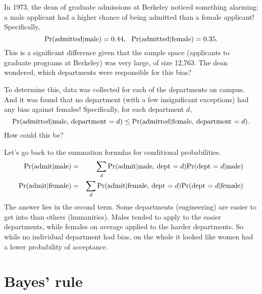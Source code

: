 In 1973, the dean of graduate admissions at Berkeley noticed something alarming: a male applicant had a higher chance of being admitted than a female applicant! Specifically, 
$$ \mbox{\rm Pr}(\mbox{admitted} | \mbox{male}) = 0.44, 
\ \  \mbox{\rm Pr}(\mbox{admitted} | \mbox{female}) = 0.35.$$
This is a significant difference given that the sample space (applicants to graduate programs at Berkeley) was very large, of size 12{,}763. The dean wondered, which departments were responsible for this bias?

To determine this, data was collected for each of the departments on campus. And it was found that no department (with a few insignificant exceptions) had any bias against females! Specifically, for each department $d$,
$$ \mbox{\rm Pr}(\mbox{admitted} | \mbox{male, department $=d$}) 
\leq \mbox{\rm Pr}(\mbox{admitted} | \mbox{female, department $=d$}).$$
How could this be?

Let's go back to the summation formulas for conditional probabilities.
\begin{eqnarray*}
\mbox{\rm Pr}(\mbox{admit} | \mbox{male}) 
& = & 
\sum_d \mbox{\rm Pr}(\mbox{admit} | \mbox{male, dept $= d$}) \mbox{\rm Pr}(\mbox{dept $=d$} | \mbox{male}) \\
\mbox{\rm Pr}(\mbox{admit} | \mbox{female}) 
& = & 
\sum_d \mbox{\rm Pr}(\mbox{admit} | \mbox{female, dept $= d$}) \mbox{\rm Pr}(\mbox{dept $=d$} | \mbox{female}) 
\end{eqnarray*}
The answer lies in the second term. Some departments (engineering) are easier to get into than others (humanities). Males tended to apply to the easier departments, while females on average applied to the harder departments. So while no individual department had bias, on the whole it looked like women had a lower probability of acceptance.

\section{Bayes' rule}

